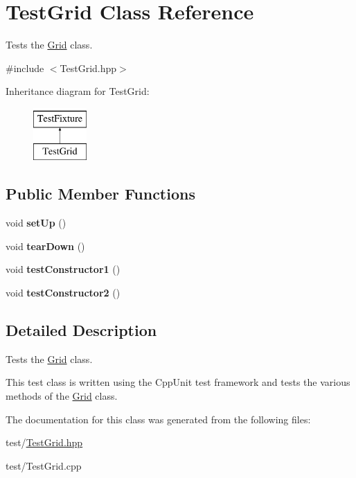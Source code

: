 \hypertarget{class_test_grid}{}\section{Test\+Grid Class Reference}
\label{class_test_grid}


Tests the \hyperlink{class_grid}{Grid} class.  




{\ttfamily \#include $<$Test\+Grid.\+hpp$>$}

Inheritance diagram for Test\+Grid\+:\begin{figure}[H]
\begin{center}
\leavevmode
\includegraphics[height=2.000000cm]{class_test_grid}
\end{center}
\end{figure}
\subsection*{Public Member Functions}
\begin{DoxyCompactItemize}
\item 
\mbox{\label{class_test_grid_afd080168a37a3a3374fa11b0a48ef1bf}} 
void {\bfseries set\+Up} ()
\item 
\mbox{\label{class_test_grid_adf786b04244594688bf871ded5cbf860}} 
void {\bfseries tear\+Down} ()
\item 
\mbox{\label{class_test_grid_a5f4d88062bad9698b14e99067cb6a3bf}} 
void {\bfseries test\+Constructor1} ()
\item 
\mbox{\label{class_test_grid_accd340be5dc916a1769bab50471c1cc8}} 
void {\bfseries test\+Constructor2} ()
\end{DoxyCompactItemize}


\subsection{Detailed Description}
Tests the \hyperlink{class_grid}{Grid} class. 

This test class is written using the Cpp\+Unit test framework and tests the various methods of the \hyperlink{class_grid}{Grid} class. 

The documentation for this class was generated from the following files\+:\begin{DoxyCompactItemize}
\item 
test/\hyperlink{_test_grid_8hpp}{Test\+Grid.\+hpp}\item 
test/Test\+Grid.\+cpp\end{DoxyCompactItemize}
